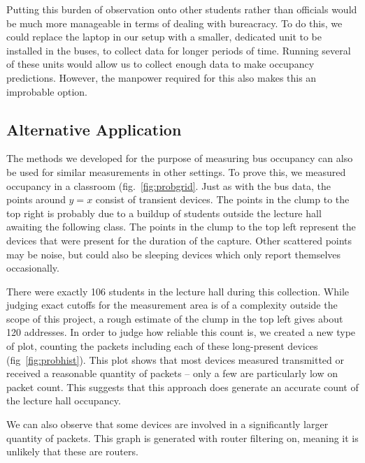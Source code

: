 Putting this burden of observation onto other students rather than officials would be much more manageable in terms of dealing with bureacracy.
To do this, we could replace the laptop in our setup with a smaller, dedicated unit to be installed in the buses, to collect data for longer periods of time.
Running several of these units would allow us to collect enough data to make occupancy predictions.
However, the manpower required for this also makes this an improbable option.

\subsection*{Alternative Application}
The methods we developed for the purpose of measuring bus occupancy can also be used for similar measurements in other settings.
To prove this, we measured occupancy in a classroom (fig.~\ref{fig:probgrid}.
Just as with the bus data, the points around \(y=x\) consist of transient devices.
The points in the clump to the top right is probably due to a buildup of students outside the lecture hall awaiting the following class.
The points in the clump to the top left represent the devices that were present for the duration of the capture.
Other scattered points may be noise, but could also be sleeping devices which only report themselves occasionally.

There were exactly 106 students in the lecture hall during this collection.
While judging exact cutoffs for the measurement area is of a complexity outside the scope of this project, a rough estimate of the clump in the top left gives about 120 addresses.
In order to judge how reliable this count is, we created a new type of plot, counting the packets including each of these long-present devices (fig~\ref{fig:probhist}).
This plot shows that most devices measured transmitted or received a reasonable quantity of packets -- only a few are particularly low on packet count.
This suggests that this approach does generate an accurate count of the lecture hall occupancy.

We can also observe that some devices are involved in a significantly larger quantity of packets.
This graph is generated with router filtering on, meaning it is unlikely that these are routers.
